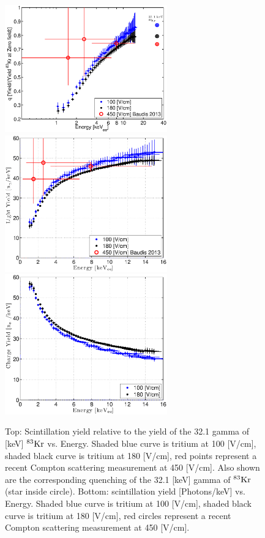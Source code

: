  \begin{figure}[h!]\centering
\includegraphics[width=70mm]{q_all_log_Tritium_Dec_2013_Charge_Yield_180_corr.eps}
\includegraphics[width=70mm]{LY_all_Tritium_Dec_2013_Charge_Yield_180_corr.eps}
\includegraphics[width=70mm]{Charge_Y_all_Tritium_Dec_2013_Charge_Yield_180_corr.eps}
\caption{Top: Scintillation yield relative to the yield of the 32.1 gamma of [keV] $\rm^{83}Kr $  vs. Energy. Shaded blue curve is tritium at 100 [V/cm], shaded black curve is tritium at 180 [V/cm], red points represent a recent Compton scattering measurement at 450 [V/cm]. Also shown are the corresponding quenching of the 32.1 [keV]  gamma of $\rm^{83}Kr$ (star inside circle). Bottom: scintillation yield [Photons/keV] vs. Energy. Shaded blue curve is tritium at 100 [V/cm], shaded black curve is tritium at 180 [V/cm], red circles represent a recent Compton scattering measurement at 450 [V/cm].}
\label{fig:L_Q_Yield_Baudis}
\end{figure}


